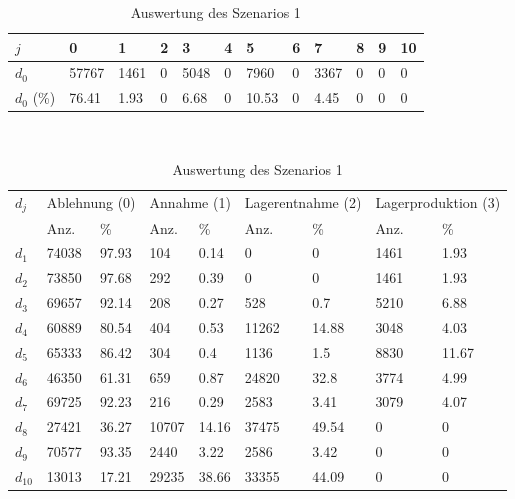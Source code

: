\begin{table}[h!]
\renewcommand{\arraystretch}{1.5}
  \begin{center}
    \caption{Auswertung des Szenarios 1}  \label{AS1}
    \vspace*{3mm}
    \begin{tabular}{l l l l l l l l l l l l }  \hline 
         $j$ & 0 & 1  & 2 & 3 & 4  & 5 & 6 & 7 & 8 & 9 & 10  \\ \hline
$d_{0}$ &  57767 &  1461 &  0 &  5048 &  0 &  7960 &  0 &  3367 &  0 &  0 &  0 \\
$d_{0}$ (\%) &  76.41 &  1.93 &  0 &  6.68 &  0 &  10.53 &  0 &  4.45 & 0 &  0 &  0 \\
\hline
    \end{tabular} \\[3mm]
        \begin{tabular}{ l l l l l l l l l}   \hline    %
    $d_j$ & \multicolumn{2}{c}{Ablehnung (0)} & \multicolumn{2}{c}{Annahme (1)}  & \multicolumn{2}{c}{Lagerentnahme (2)} & \multicolumn{2}{c}{Lagerproduktion (3)}\\
    & Anz. & \% & Anz. & \% & Anz. & \% & Anz. & \% \\ \hline 
$d_{1}$  &  74038 &  97.93 &    104 &   0.14 &    0 &    0 &  1461 &   1.93 \\
$d_{2}$  &  73850 &  97.68 &    292 &   0.39 &    0 &    0 &  1461 &   1.93 \\
$d_{3}$  &  69657 &  92.14 &    208 &   0.27 &    528 &    0.7 &  5210 &   6.88 \\
$d_{4}$  &  60889 &  80.54 &    404 &   0.53 &  11262 &  14.88 &  3048 &   4.03 \\
$d_{5}$  &  65333 &  86.42 &    304 &    0.4 &   1136 &    1.5 &  8830 &  11.67 \\
$d_{6}$  &  46350 &  61.31 &    659 &   0.87 &  24820 &   32.8 &  3774 &   4.99 \\
$d_{7}$  &  69725 &  92.23 &    216 &   0.29 &   2583 &   3.41 &  3079 &   4.07 \\
$d_{8}$  &  27421 &  36.27 &  10707 &  14.16 &  37475 &  49.54 &   0 &    0 \\
$d_{9}$  &  70577 &  93.35 &   2440 &   3.22 &   2586 &   3.42 &   0 &    0 \\
$d_{10}$ &  13013 &  17.21 &  29235 &  38.66 &  33355 &  44.09 &   0 &    0 \\
          \hline
   \end{tabular} \\[3mm]
     \end{center}
\end{table}

